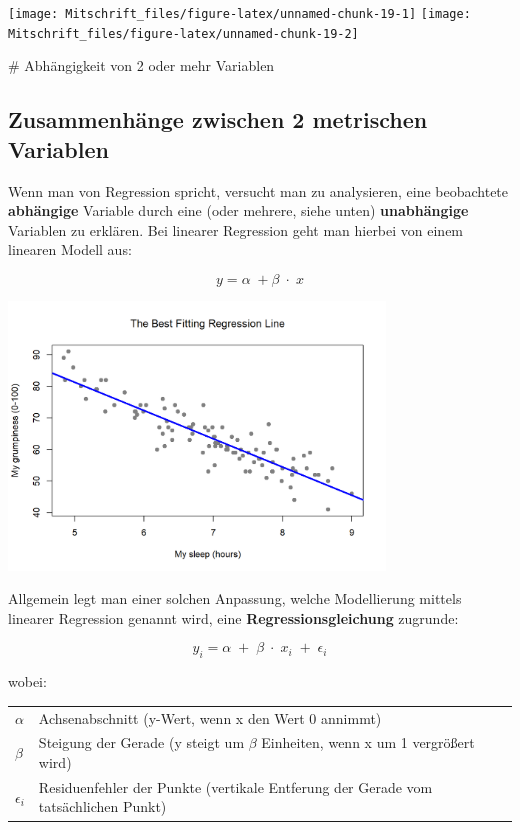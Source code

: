 \documentclass[
]{article}
\begin{document}
\texttt{[image: Mitschrift\_files/figure-latex/unnamed-chunk-19-1]}
\texttt{[image: Mitschrift\_files/figure-latex/unnamed-chunk-19-2]}

\clearpage

\# Abhängigkeit von 2 oder mehr Variablen

\hypertarget{zusammenhuxe4nge-zwischen-2-metrischen-variablen}{%
\subsection{Zusammenhänge zwischen 2 metrischen
Variablen}\label{zusammenhuxe4nge-zwischen-2-metrischen-variablen}}

\tcolorbox

Wenn man von Regression spricht, versucht man zu analysieren, eine
beobachtete \textbf{abhängige} Variable durch eine (oder mehrere, siehe
unten) \textbf{unabhängige} Variablen zu erklären. Bei linearer
Regression geht man hierbei von einem linearen Modell aus:

\[y = \alpha \; + \beta \; \cdot \; x\]

\vspace{3mm}

\includegraphics[width=10cm, center]{Fig7} \vspace{3mm}

Allgemein legt man einer solchen Anpassung, welche Modellierung mittels
linearer Regression genannt wird, eine \textbf{Regressionsgleichung}
zugrunde:

\[y_i = \alpha \; + \; \beta \; \cdot \; x_i \; + \; \epsilon_i\]

\bgroup wobei: \begin{tabular}[t]{>{$}l<{$} @{${} \quad ... \quad {}$} l}
\alpha  &   Achsenabschnitt (y-Wert, wenn x den Wert 0 annimmt) \\
\beta   &   Steigung der Gerade (y steigt um $\beta$ Einheiten, wenn x um 1 vergrößert wird) \\
\epsilon_i & Residuenfehler der Punkte (vertikale Entferung der Gerade vom tatsächlichen Punkt)
\end{tabular}\\[\belowdisplayskip]\egroup
\end{document}
